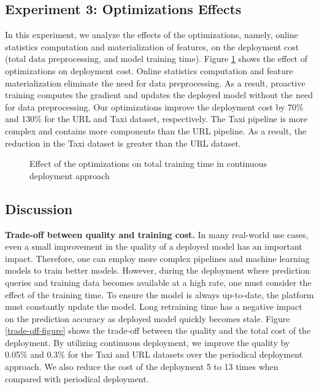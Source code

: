 \subsection{Experiment 3: Optimizations Effects}
In this experiment, we analyze the effects of the optimizations, namely, online statistics computation and materialization of features, on the deployment cost (total data preprocessing, and model training time).
Figure \ref{optimization-effect} shows the effect of optimizations on deployment cost.
Online statistics computation and feature materialization eliminate the need for data preprocessing.
As a result, proactive training computes the gradient and updates the deployed model without the need for data preprocessing.
Our optimizations improve the deployment cost by 70\% and 130\% for the URL and Taxi dataset, respectively.
The Taxi pipeline is more complex and contains more components than the URL pipeline.
As a result, the reduction in the Taxi dataset is greater than the URL dataset.

\begin{figure}[h!]
\centering
\resizebox{\columnwidth}{!}{}
\caption{Effect of the optimizations on total training time in continuous deployment approach}
\label{optimization-effect}
\end{figure}

\subsection{Discussion} \label{subsec:discussion}
\textbf{Trade-off between quality and training cost.}
In many real-world use cases, even a small improvement in the quality of a deployed model has an important impact.
Therefore, one can employ more complex pipelines and machine learning models to train better models.
However, during the deployment where prediction queries and training data becomes available at a high rate, one must consider the effect of the training time.
To ensure the model is always up-to-date, the platform must constantly update the model.
Long retraining time has a negative impact on the prediction accuracy as deployed model quickly becomes stale.
Figure \ref{trade-off-figure} shows the trade-off between the quality and the total cost of the deployment.
By utilizing continuous deployment, we improve the quality by 0.05\% and 0.3\% for the Taxi and URL datasets over the periodical deployment approach.
We also reduce the cost of the deployment 5 to 13 times when compared with periodical deployment.

